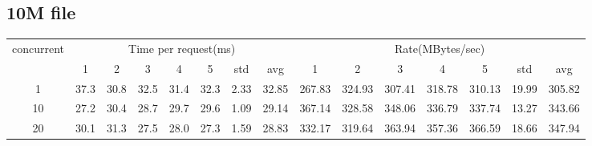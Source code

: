 \documentclass{article}
\begin{document}
\subsection*{10M file}
\begin{table}[H]
    \begin{tabular}{|c|c|c|c|c|c|c|c|c|c|c|c|c|c|c|}
        \hline
        \multirow{2}{*}{concurrent} & \multicolumn{7}{c|}{Time per request(ms)} & \multicolumn{7}{c|}{Rate(MBytes/sec)}                                                                                                   \\ \cline{2-15}
                                    & 1                                         & 2                                     & 3    & 4    & 5    & std  & avg   & 1      & 2      & 3      & 4      & 5      & std   & avg    \\ \hline
        1                           & 37.3                                      & 30.8                                  & 32.5 & 31.4 & 32.3 & 2.33 & 32.85 & 267.83 & 324.93 & 307.41 & 318.78 & 310.13 & 19.99 & 305.82 \\ \hline
        10                          & 27.2                                      & 30.4                                  & 28.7 & 29.7 & 29.6 & 1.09 & 29.14 & 367.14 & 328.58 & 348.06 & 336.79 & 337.74 & 13.27 & 343.66 \\ \hline
        20                          & 30.1                                      & 31.3                                  & 27.5 & 28.0 & 27.3 & 1.59 & 28.83 & 332.17 & 319.64 & 363.94 & 357.36 & 366.59 & 18.66 & 347.94 \\ \hline
    \end{tabular}
\end{table}
\end{document}

